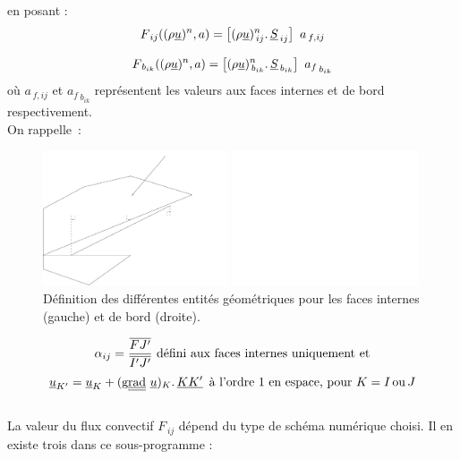 en posant : 
\begin{equation}
F_{\,ij}((\rho \underline{u})^n,a) = \left[{(\rho \underline{u})_{\,ij}^n} \text{.}\, \underline{S}_{\,ij}\right]\ a_{\,f,ij} 
\end{equation}

\begin{equation}
F_{\,{b}_{ik}}((\rho \underline{u})^n, a) =  \left[{(\rho \underline{u})_{\,{b}_{ik}}^n} \text{.}\, \underline{S}_{\,{b}_{ik}}\right]\ {a_f}_{\,{b}_{ik}} 
\end{equation}
o\`u $a_{\,f,ij}$ et ${a_f}_{\,{b}_{ik}}$ repr\'esentent les valeurs aux faces
internes et de bord respectivement.\\

On rappelle~:\\
\begin{figure}[h]
\hspace*{1cm}\parbox{8cm}{%
\centerline{\includegraphics[height=4cm]{../Base/Bilsc2/Images/facette.pdf}}}
\parbox{8cm}{%
\centerline{\includegraphics[height=4cm]{../Base/Bilsc2/Images/facebord.pdf}}}
\caption{\label{Base_Bilsc2_fig_geom}D\'efinition des diff\'erentes entit\'es
g\'eom\'etriques pour les faces internes (gauche) et de bord (droite).}
\end{figure}
\begin{equation}\notag
\displaystyle\alpha_{ij}=\frac{\overline{FJ'}}{\overline{I'J'}} \text{\ d\'efini aux faces internes uniquement et}
\end{equation}
\begin{equation}\notag
\underline{u}_{K'} = \underline{u}_{K}+(\text{g}\underline{\underline{\text{rad}}}\ {\underline{u}})_K\text{.}\, \underline{KK'}\, \text{\
\`a l'ordre 1 en espace, pour ${K = I \,\text{ou}\, J}$} 
\end{equation}\\ 
La valeur du flux convectif ${F_{\,ij}}$  d\'epend du type de sch\'ema num\'erique choisi. Il en existe trois dans ce sous-programme :


